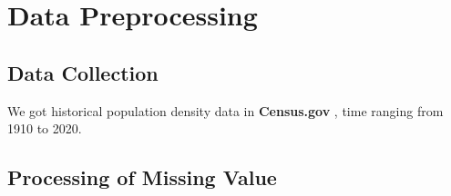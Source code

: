 
\section{Data Preprocessing}


\subsection{Data Collection}
We got historical population density data in \textbf{Census.gov} \cite{bureau_historical_nodate}, time ranging from 1910 to 2020. 


\subsection{Processing of Missing Value}

